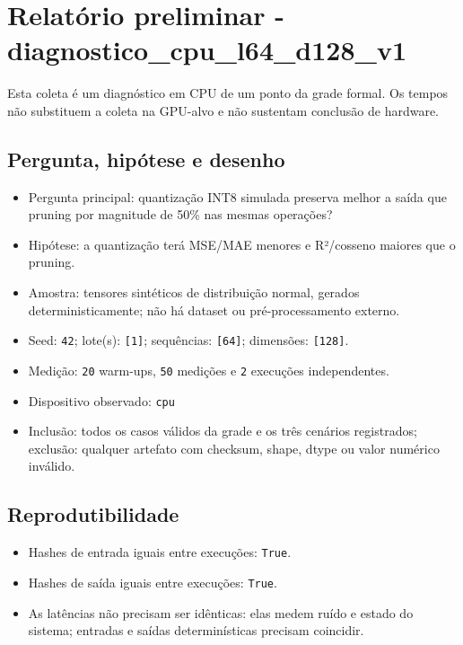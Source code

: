 

\chapter{Relatório preliminar - diagnostico\_\allowbreak{}cpu\_\allowbreak{}l64\_\allowbreak{}d128\_\allowbreak{}v1}



\begin{icquote}
Esta coleta é um diagnóstico em CPU de um ponto da grade formal. Os tempos não substituem a coleta na GPU-alvo e não sustentam conclusão de hardware.
\end{icquote}



\section{Pergunta, hipótese e desenho}


\begin{itemize}
\item Pergunta principal: quantização INT8 simulada preserva melhor a saída que pruning por magnitude de 50\% nas mesmas operações?
\item Hipótese: a quantização terá MSE/MAE menores e R²/cosseno maiores que o pruning.
\item Amostra: tensores sintéticos de distribuição normal, gerados deterministicamente; não há dataset ou pré-processamento externo.
\item Seed: \texttt{42}; lote(s): \texttt{[1]}; sequências: \texttt{[64]}; dimensões: \texttt{[128]}.
\item Medição: \texttt{20} warm-ups, \texttt{50} medições e \texttt{2} execuções independentes.
\item Dispositivo observado: \texttt{cpu}
\item Inclusão: todos os casos válidos da grade e os três cenários registrados; exclusão: qualquer artefato com checksum, shape, dtype ou valor numérico inválido.
\end{itemize}


\section{Reprodutibilidade}


\begin{itemize}
\item Hashes de entrada iguais entre execuções: \texttt{True}.
\item Hashes de saída iguais entre execuções: \texttt{True}.
\item As latências não precisam ser idênticas: elas medem ruído e estado do sistema; entradas e saídas determinísticas precisam coincidir.
\end{itemize}


